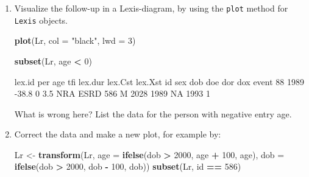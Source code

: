 \documentclass[
]{book}
\newenvironment{Shaded}{\begin{snugshade}}{\end{snugshade}}
\newcommand{\AttributeTok}[1]{\textcolor[rgb]{0.13,0.29,0.53}{#1}}
\newcommand{\DecValTok}[1]{\textcolor[rgb]{0.00,0.00,0.81}{#1}}
\newcommand{\FunctionTok}[1]{\textcolor[rgb]{0.13,0.29,0.53}{\textbf{#1}}}
\newcommand{\NormalTok}[1]{#1}
\newcommand{\OtherTok}[1]{\textcolor[rgb]{0.56,0.35,0.01}{#1}}
\newcommand{\SpecialCharTok}[1]{\textcolor[rgb]{0.81,0.36,0.00}{\textbf{#1}}}
\newcommand{\StringTok}[1]{\textcolor[rgb]{0.31,0.60,0.02}{#1}}
\begin{document}
\begin{enumerate}
\begin{Shaded}
\begin{Highlighting}[]
\NormalTok{Transitions:}
\NormalTok{     To}
\NormalTok{From  NRA ESRD Records: Events: Risk time: Persons:}
\NormalTok{  NRA  48   77      125      77       1085      125}
\end{Highlighting}
\end{Shaded}

  Make sure you know what the variables in \texttt{Lr} stand for.
\item
  Visualize the follow-up in a Lexis-diagram, by using the
  \texttt{plot} method for \texttt{Lexis} objects.

\begin{Shaded}
\begin{Highlighting}[]
\FunctionTok{plot}\NormalTok{(Lr, }\AttributeTok{col =} \StringTok{"black"}\NormalTok{, }\AttributeTok{lwd =} \DecValTok{3}\NormalTok{)}
\end{Highlighting}
\end{Shaded}

\begin{Shaded}
\begin{Highlighting}[]
\FunctionTok{subset}\NormalTok{(Lr, age }\SpecialCharTok{\textless{}} \DecValTok{0}\NormalTok{)}
\end{Highlighting}
\end{Shaded}

\begin{Shaded}
\begin{Highlighting}[]
\NormalTok{ lex.id  per   age tfi lex.dur lex.Cst lex.Xst  id sex  dob  doe dor  dox event}
\NormalTok{     88 1989 {-}38.8   0     3.5     NRA    ESRD 586   M 2028 1989  NA 1993     1}
\end{Highlighting}
\end{Shaded}

  What is wrong here? List the data for the person with negative entry age.
\item
  Correct the data and make a new plot, for example by:

\begin{Shaded}
\begin{Highlighting}[]
\NormalTok{Lr }\OtherTok{\textless{}{-}} \FunctionTok{transform}\NormalTok{(Lr, }\AttributeTok{age =} \FunctionTok{ifelse}\NormalTok{(dob }\SpecialCharTok{\textgreater{}} \DecValTok{2000}\NormalTok{, age }\SpecialCharTok{+} \DecValTok{100}\NormalTok{, age),}
                    \AttributeTok{dob =} \FunctionTok{ifelse}\NormalTok{(dob }\SpecialCharTok{\textgreater{}} \DecValTok{2000}\NormalTok{, dob }\SpecialCharTok{{-}} \DecValTok{100}\NormalTok{, dob))}
\FunctionTok{subset}\NormalTok{(Lr, id }\SpecialCharTok{==} \DecValTok{586}\NormalTok{)}
\end{Highlighting}
\end{Shaded}


\end{enumerate}
\end{document}
